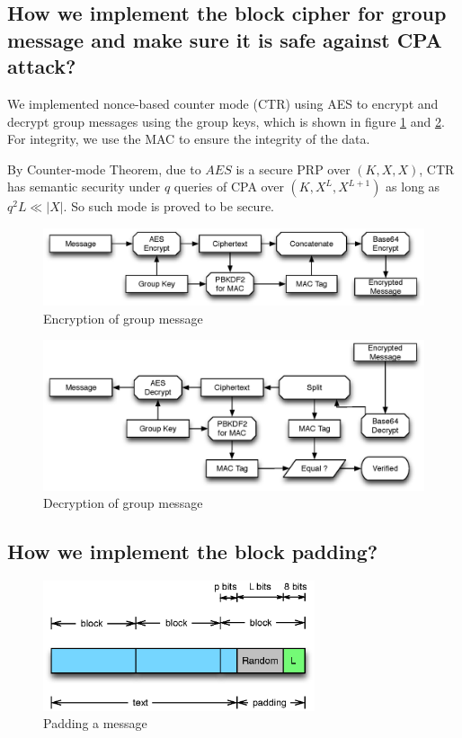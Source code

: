 \subsection{How we implement the block cipher for group message and make sure it is safe against CPA attack?}
We implemented nonce-based counter mode (CTR) using AES to encrypt and decrypt group messages using the group keys, which is shown in figure \ref{fig:msg_enc} and \ref{fig:msg_dec}. For integrity, we use the MAC to ensure the integrity of the data.

By Counter-mode Theorem, due to $AES$ is a secure PRP over $(K,X,X)$, CTR has semantic security under $q$ queries of CPA over $(K,X^L,X^{L+1})$ as long as $q^2L \ll |X|$. 
So such mode is proved to be secure.

\begin{figure}[h!]
\centering
\caption{Encryption of group message}
\label{fig:msg_enc}
\includegraphics[width=12cm]{fig/msg_enc.eps}
\end{figure}
\begin{figure}[h!]
\centering
\caption{Decryption of group message}
\label{fig:msg_dec}
\includegraphics[width=12cm]{fig/msg_dec.eps}
\end{figure}

\subsection{How we implement the block padding?}

\begin{figure}[h!]
\centering
\caption{Padding a message}
\label{fig:padding}
\includegraphics[width=8cm]{fig/padding.eps}
\end{figure}

